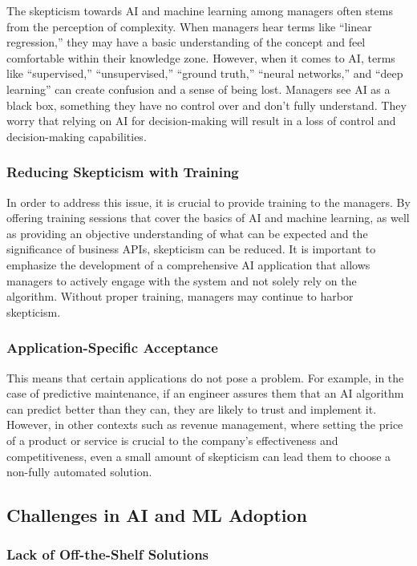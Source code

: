 The skepticism towards AI and machine learning among managers often
stems from the perception of complexity. When managers hear terms like
``linear regression,'' they may have a basic understanding of the
concept and feel comfortable within their knowledge zone. However, when
it comes to AI, terms like ``supervised,'' ``unsupervised,'' ``ground
truth,'' ``neural networks,'' and ``deep learning'' can create confusion
and a sense of being lost. Managers see AI as a black box, something
they have no control over and don't fully understand. They worry that
relying on AI for decision-making will result in a loss of control and
decision-making capabilities.

\subsubsection{Reducing Skepticism with Training}

In order to address this issue, it is crucial to provide training to the
managers. By offering training sessions that cover the basics of AI and
machine learning, as well as providing an objective understanding of
what can be expected and the significance of business APIs, skepticism
can be reduced. It is important to emphasize the development of a
comprehensive AI application that allows managers to actively engage
with the system and not solely rely on the algorithm. Without proper
training, managers may continue to harbor skepticism.

\subsubsection{Application-Specific Acceptance}

This means that certain applications do not pose a problem. For example,
in the case of predictive maintenance, if an engineer assures them that
an AI algorithm can predict better than they can, they are likely to
trust and implement it. However, in other contexts such as revenue
management, where setting the price of a product or service is crucial
to the company's effectiveness and competitiveness, even a small amount
of skepticism can lead them to choose a non-fully automated solution.

\subsection{Challenges in AI and ML Adoption}

\subsubsection{Lack of Off-the-Shelf Solutions}

